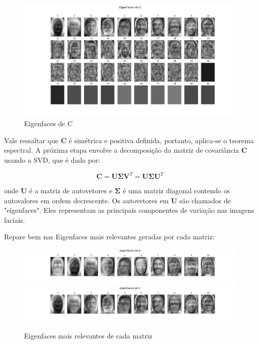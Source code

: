 \documentclass[12pt]{article}
\begin{document}
            \begin{figure}[H]
                  \centering
                  \includegraphics[width=1\textwidth]{img/EMAP_3.png}
                  \caption{Eigenfaces de C}
                  \label{fig:exemplo}
            \end{figure}

            Vale ressaltar que $\boldsymbol{C}$ é simétrica e positiva definida, portanto, aplica-se o teorema espectral. A próxima etapa envolve a decomposição da matriz de covariância $\boldsymbol{C}$ usando a SVD, que é dada por:

            $$
            \boldsymbol{C} = \boldsymbol{U} \boldsymbol{\Sigma} \boldsymbol{V}^{T}  = \boldsymbol{U} \boldsymbol{\Sigma} \boldsymbol{U}^{T}
            $$

            onde $\boldsymbol{U}$ é a matriz de autovetores e $\boldsymbol{\Sigma}$ é uma matriz diagonal contendo os autovalores em ordem decrescente. Os autovetores em $\boldsymbol{U}$ são chamados de "eigenfaces". Eles representam as principais componentes de variação nas imagens faciais.

            Repare bem nas Eigenfaces mais relevantes geradas por cada matriz:

            \begin{figure}[H]
                  \centering
                  \includegraphics[width=1\textwidth]{img/EMAP_4.png}
                  \includegraphics[width=1\textwidth]{img/EMAP_5.png}
                  \caption{Eigenfaces mais relevantes de cada matriz}
                  \label{fig:exemplo}
            \end{figure}
\end{document}
